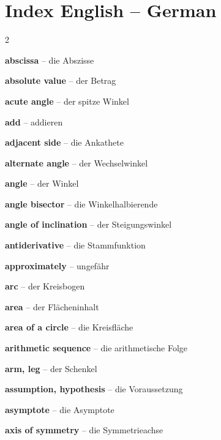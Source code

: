 \newpage
\section{Index English -- German}
\begin{multicols}{2}\small\raggedright

\par\nopagebreak
\textbf{abscissa} -- die Abszisse\dotfill\hyperref[e:117]{\pageref*{e:117}}\par
\textbf{absolute value} -- der Betrag\dotfill\hyperref[e:53]{\pageref*{e:53}}\par
\textbf{acute angle} -- der spitze Winkel\dotfill\hyperref[e:157]{\pageref*{e:157}}\par
\textbf{add} -- addieren\dotfill\hyperref[e:14]{\pageref*{e:14}}\par
\textbf{adjacent side} -- die Ankathete\dotfill\hyperref[e:188]{\pageref*{e:188}}\par
\textbf{alternate angle} -- der Wechselwinkel\dotfill\hyperref[e:168]{\pageref*{e:168}}\par
\textbf{angle} -- der Winkel\dotfill\hyperref[e:153]{\pageref*{e:153}}\par
\textbf{angle bisector} -- die Winkelhalbierende\dotfill\hyperref[e:156]{\pageref*{e:156}}\par
\textbf{angle of inclination} -- der Steigungswinkel\dotfill\hyperref[e:310]{\pageref*{e:310}}\par
\textbf{antiderivative} -- die Stammfunktion\dotfill\hyperref[e:285]{\pageref*{e:285}}\par
\textbf{approximately} -- ungefähr\dotfill\hyperref[e:69]{\pageref*{e:69}}\par
\textbf{arc} -- der Kreisbogen\dotfill\hyperref[e:221]{\pageref*{e:221}}\par
\textbf{area} -- der Flächeninhalt\dotfill\hyperref[e:210]{\pageref*{e:210}}\par
\textbf{area of a circle} -- die Kreisfläche\dotfill\hyperref[e:223]{\pageref*{e:223}}\par
\textbf{arithmetic sequence} -- die arithmetische Folge\dotfill\hyperref[e:259]{\pageref*{e:259}}\par
\textbf{arm, leg} -- der Schenkel\dotfill\hyperref[e:155]{\pageref*{e:155}}\par
\textbf{assumption, hypothesis} -- die Voraussetzung\dotfill\hyperref[e:348]{\pageref*{e:348}}\par
\textbf{asymptote} -- die Asymptote\dotfill\hyperref[e:271]{\pageref*{e:271}}\par
\textbf{axis of symmetry} -- die Symmetrieachse\dotfill\hyperref[e:171]{\pageref*{e:171}}\par


\end{multicols}
